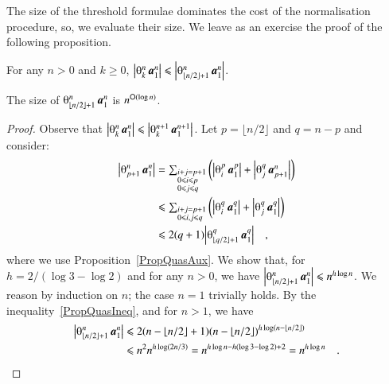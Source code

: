The size of the threshold formulae dominates the cost of the normalisation procedure, so, we evaluate their size. We leave as an exercise the proof of the following proposition.

\begin{proposition}\label{PropQuasAux}
For any $n>0$ and $k\ge0$, $\size{\th kn\avec1n}\le\size{\th{\lfloor n/2\rfloor+1}n\avec1n}$.
\end{proposition}

\begin{lemma}\label{LemmaQuas}
The size of\/ $\th{\lfloor n/2\rfloor+1}n\avec1n$ is $n^{{\mathsf O}(\log n)}$.
\end{lemma}

\begin{proof}
Observe that $\size{\th kn\avec1n}\le\size{\th k{n+1}\avec1{n+1}}$. Let $p=\lfloor n/2\rfloor$ and $q=n-p$ and consider:
\begin{equation}\label{PropQuasIneq}
\begin{split}
\size{\th{p+1}n\avec1n}
&=\textstyle\sum_{\begin{subarray}{l}i+j=p+1    \\
                                     0\le i\le p\\
                                     0\le j\le q
                  \end{subarray}}
  \left(\size{\th ip\avec1p}+
        \size{\th jq\avec{p+1}n}\right)             \\
&\le\textstyle\sum_{\begin{subarray}{l}i+j=p+1\\
                                       0\le i,j\le q
                    \end{subarray}}
  \left(\size{\th iq\avec1q}+
        \size{\th jq\avec1q}\right)                 \\
&\le2(q+1)
  \size{\th{\lfloor q/2\rfloor+1}q\avec1q}\quad,
\end{split}
\end{equation}
where we use Proposition~\ref{PropQuasAux}. We show that, for $h=2/(\log3-\log2)$ and for any $n>0$, we have $\size{\th{\lfloor n/2\rfloor+1}n\avec1n}\le n^{h\log n}$. We reason by induction on $n$; the case $n=1$ trivially holds. By the inequality~\eqref{PropQuasIneq}, and for $n>1$, we have
\begin{equation*}
\begin{split}
\size{\th{\lfloor n/2\rfloor+1}n\avec1n}
&\le2(n-\lfloor n/2\rfloor+1)
     (n-\lfloor n/2\rfloor)^{h\log(n-\lfloor n/2\rfloor)}       \\
&\le n^2n^{h\log(2n/3)}=n^{h\log n-h(\log3-\log2)+2}=n^{h\log n}
\quad.
\end{split}
\end{equation*}
\end{proof}

